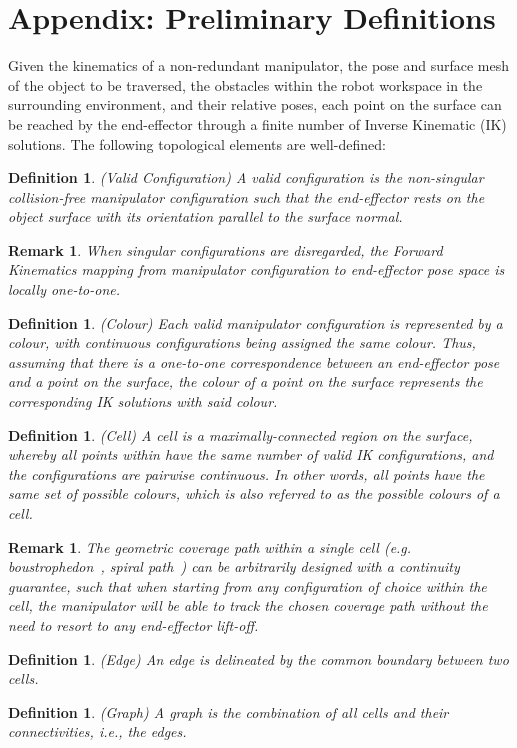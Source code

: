 \documentclass[journal]{IEEEtran}
\newtheorem{definition}[theorem]{Definition}
\newtheorem{remark}[theorem]{Remark}
\begin{document}
\section*{Appendix: Preliminary Definitions}
\label{appendix_preliminaries}
Given the kinematics of a non-redundant manipulator, the pose and surface mesh of the object to be traversed, the obstacles within the robot workspace in the surrounding 
environment, and their relative poses, each point on the surface can be reached by the end-effector through a finite number of Inverse Kinematic (IK) solutions. The following topological elements are well-defined: 
\begin{definition}
(Valid Configuration) A valid configuration is the non-singular~\cite{Yoshikawa1990Translational} collision-free manipulator configuration such that the end-effector rests on 
the object surface with its orientation parallel to the surface normal.  
\end{definition}
\begin{remark}
When singular configurations are disregarded, the Forward Kinematics mapping from manipulator configuration to end-effector pose space is locally one-to-one.  
\end{remark}
\begin{definition}
(Colour) Each valid manipulator configuration is represented by a colour, with continuous configurations being assigned the same colour. Thus, assuming that there is a one-to-one correspondence between an end-effector pose and a point on the surface, the colour of a point on the surface represents the corresponding IK solutions with said colour. 
\end{definition}
\begin{definition}
(Cell) A cell is a maximally-connected region on the surface, whereby all points within have the same number of valid IK configurations, and the configurations are pairwise continuous. 
In other words, all points have the same set of possible colours, which is also referred to as the possible colours of a cell. 
\end{definition}
\begin{remark}
The geometric coverage path within a single cell (e.g. boustrophedon~\cite{choset1998coverage}, spiral path~\cite{hassan2018a}) can be arbitrarily designed with a continuity guarantee, such that when starting from any configuration of choice within the cell, the manipulator will be able to track the chosen coverage path without the need to resort to any end-effector lift-off. 
\end{remark}
\begin{definition}
(Edge) An edge is delineated by the common boundary between two cells.  
\end{definition}
\begin{definition}
(Graph) A graph is the combination of all cells and their connectivities, i.e., the edges. 
\end{definition}
\end{document}
